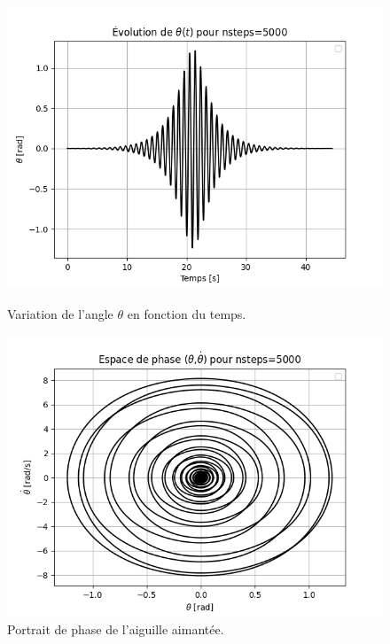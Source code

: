 \documentclass[a4paper,12pt,twoside]{article}
\begin{document}
\begin{figure}[H]
    \centering
    \begin{minipage}{0.47\textwidth}
        \centering
        \includegraphics[width=\linewidth]{graphes/question_2_theta_t.png}
        \captionsetup{justification=centering}
        \caption{Variation de l'angle $\theta$ en fonction du temps.}
        \label{fig2}
    \end{minipage}
    \hfill
    \begin{minipage}{0.47\textwidth}
        \centering
        \includegraphics[width=\linewidth]{graphes/question_2_portrait_phase.png}
        \captionsetup{justification=centering}
        \caption{Portrait de phase de l'aiguille aimantée.}
        \label{fig3}
    \end{minipage}
\end{figure}
\end{document}
